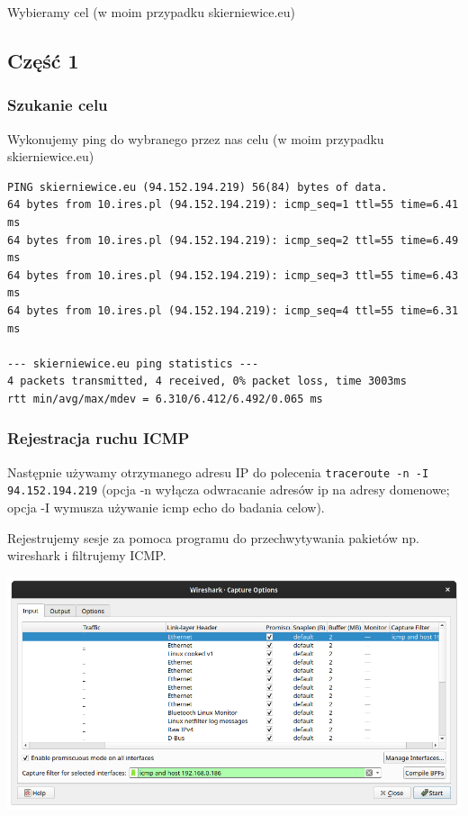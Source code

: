 \documentclass[11pt]{article}
\begin{document}
Wybieramy cel (w moim przypadku skierniewice.eu)
\subsection{Część 1}
\label{sec:org2129475}
\subsubsection{Szukanie celu}
\label{sec:org84cb5af}
Wykonujemy ping do wybranego przez nas celu (w moim przypadku skierniewice.eu)
\begin{verbatim}
PING skierniewice.eu (94.152.194.219) 56(84) bytes of data.
64 bytes from 10.ires.pl (94.152.194.219): icmp_seq=1 ttl=55 time=6.41 ms
64 bytes from 10.ires.pl (94.152.194.219): icmp_seq=2 ttl=55 time=6.49 ms
64 bytes from 10.ires.pl (94.152.194.219): icmp_seq=3 ttl=55 time=6.43 ms
64 bytes from 10.ires.pl (94.152.194.219): icmp_seq=4 ttl=55 time=6.31 ms

--- skierniewice.eu ping statistics ---
4 packets transmitted, 4 received, 0% packet loss, time 3003ms
rtt min/avg/max/mdev = 6.310/6.412/6.492/0.065 ms

\end{verbatim}
\subsubsection{Rejestracja ruchu ICMP}
\label{sec:org551b916}
Następnie używamy otrzymanego adresu IP do polecenia \texttt{traceroute -n -I 94.152.194.219} (opcja -n wyłącza odwracanie adresów ip na adresy domenowe; opcja -I wymusza używanie icmp echo do badania celow).


Rejestrujemy sesje za pomoca programu do przechwytywania pakietów np. wireshark i filtrujemy ICMP.
\begin{center}
\includegraphics[width=.9\linewidth]{./part1/options.png}
\end{center}
\end{document}
